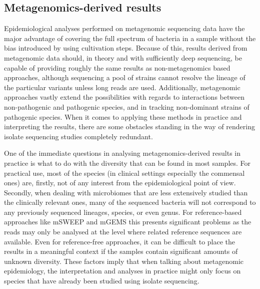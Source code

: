 \documentclass[officiallayout]{tktla}
\begin{document}
\subsection{Metagenomics-derived results}
Epidemiological analyses performed on metagenomic sequencing data have
the major advantage of covering the full spectrum of bacteria in a
sample without the bias introduced by using cultivation steps. Because
of this, results derived from metagenomic data should, in theory and
with sufficiently deep sequencing, be capable of providing roughly the
same results as non-metagenomics based approaches, although sequencing
a pool of strains cannot resolve the lineage of the particular
variants unless long reads are used. Additionally, metagenomic
approaches vastly extend the possibilities with regards to
interactions between non-pathogenic and pathogenic species, and in
tracking non-dominant strains of pathogenic species. When it comes to
applying these methods in practice and interpreting the results, there
are some obstacles standing in the way of rendering isolate sequencing
studies completely redundant.

One of the immediate questions in analysing metagenomics-derived
results in practice is what to do with the diversity that can be found
in most samples. For practical use, most of the species (in clinical
settings especially the commensal ones) are, firstly, not of any
interest from the epidemiological point of view. Secondly, when
dealing with microbiomes that are less extensively studied than the
clinically relevant ones, many of the sequenced bacteria will not
correspond to any previously sequenced lineages, species, or even
genus. For reference-based approaches like mSWEEP and mGEMS this
presents significant problems as the reads may only be analysed at the
level where related reference sequences are available. Even for
reference-free approaches, it can be difficult to place the results in
a meaningful context if the samples contain significant amounts of
unknown diversity. These factors imply that when talking about
metagenomic epidemiology, the interpretation and analyses in practice
might only focus on species that have already been studied using
isolate sequencing.
\end{document}

